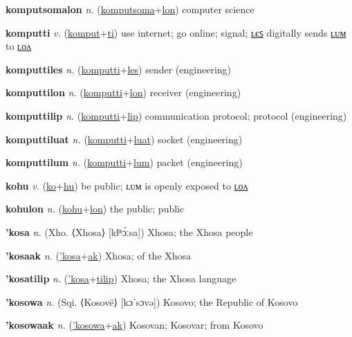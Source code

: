 \textbf{\hypertarget{komputsomalon}{komputsomalon}} \textit{n.} (\hyperlink{komputsoma}{komputsoma}+\allowbreak \hyperlink{lon}{lon})
computer science

\textbf{\hypertarget{komputti}{komputti}} \textit{v.} (\hyperlink{komput}{komput}+\allowbreak \hyperlink{ti}{ti})
use internet; go online; signal; \hyperlink{komputtiles}{ʟєꜱ} digitally sends \hyperlink{komputtilum}{ʟᴜᴍ} to \hyperlink{komputtilon}{ʟᴏᴧ}

\textbf{\hypertarget{komputtiles}{komputtiles}} \textit{n.} (\hyperlink{komputti}{komputti}+\allowbreak \hyperlink{les}{les})
sender (engineering)

\textbf{\hypertarget{komputtilon}{komputtilon}} \textit{n.} (\hyperlink{komputti}{komputti}+\allowbreak \hyperlink{lon}{lon})
receiver (engineering)

\textbf{\hypertarget{komputtilip}{komputtilip}} \textit{n.} (\hyperlink{komputti}{komputti}+\allowbreak \hyperlink{lip}{lip})
communication protocol; protocol (engineering)

\textbf{\hypertarget{komputtiluat}{komputtiluat}} \textit{n.} (\hyperlink{komputti}{komputti}+\allowbreak \hyperlink{luat}{luat})
socket (engineering)

\textbf{\hypertarget{komputtilum}{komputtilum}} \textit{n.} (\hyperlink{komputti}{komputti}+\allowbreak \hyperlink{lum}{lum})
packet (engineering)

\textbf{\hypertarget{kohu}{kohu}} \textit{v.} (\hyperlink{ko}{ko}+\allowbreak \hyperlink{hu}{hu})
be public; ʟᴜᴍ is openly exposed to \hyperlink{kohulon}{ʟᴏᴧ}

\textbf{\hypertarget{kohulon}{kohulon}} \textit{n.} (\hyperlink{kohu}{kohu}+\allowbreak \hyperlink{lon}{lon})
the public; public

\textbf{\hypertarget{'kosa}{'kosa}} \textit{n.} (Xho. ⟨Xhosa⟩ [kǁʰɔ́ːsa])
Xhosa; the Xhosa people

\textbf{\hypertarget{'kosaak}{'kosaak}} \textit{n.} (\hyperlink{'kosa}{'kosa}+\allowbreak \hyperlink{ak}{ak})
Xhosa; of the Xhosa

\textbf{\hypertarget{'kosatilip}{'kosatilip}} \textit{n.} (\hyperlink{'kosa}{'kosa}+\allowbreak \hyperlink{tilip}{tilip})
Xhosa; the Xhosa language

\textbf{\hypertarget{'kosowa}{'kosowa}} \textit{n.} (Sqi. ⟨Kosovë⟩ [kɔˈsɔvə])
Kosovo; the Republic of Kosovo

\textbf{\hypertarget{'kosowaak}{'kosowaak}} \textit{n.} (\hyperlink{'kosowa}{'kosowa}+\allowbreak \hyperlink{ak}{ak})
Kosovan; Kosovar; from Kosovo

